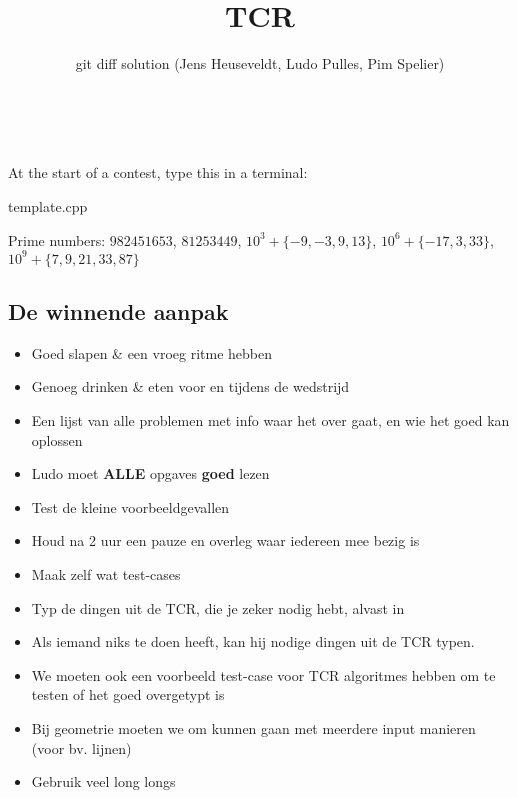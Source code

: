 \documentclass[8pt,a4paper,landscape,oneside]{amsart}
\title{TCR}
\author{git diff solution (Jens Heuseveldt, Ludo Pulles, Pim Spelier)}
\begin{document}
\begin{multicols*}{3}
\maketitle
\begin{center}
	\makeatletter
	\textbf{\@title} \\
	\emph{\@author}
	\makeatother
\end{center}

\tableofcontents

\begin{center}
At the start of a contest, type this in a terminal:
\end{center}



\begin{center}
template.cpp
\end{center}



Prime numbers: $\mathit{982451653}$, $\mathit{81253449}$, $10^3 + \{-9,-3,9,13\}$, $10^6 + \{-17, 3, 33\}$, $10^9 + \{7,9,21,33,87\}$

\subsection{De winnende aanpak}

\begin{itemize}
	\setlength\itemsep{-.25em}
	\item Goed slapen \& een vroeg ritme hebben
	\item Genoeg drinken \& eten voor en tijdens de wedstrijd
	\item Een lijst van alle problemen met info waar het over gaat, en wie het goed kan oplossen
	\item Ludo moet {\huge\textbf{ALLE}} opgaves \textbf{goed} lezen
	\item Test de kleine voorbeeldgevallen
	\item Houd na 2 uur een pauze en overleg waar iedereen mee bezig is
	\item Maak zelf wat test-cases
	\item Typ de dingen uit de TCR, die je zeker nodig hebt, alvast in
	\item Als iemand niks te doen heeft, kan hij nodige dingen uit de TCR typen.
	\item We moeten ook een voorbeeld test-case voor TCR algoritmes hebben om te testen of het goed overgetypt is
	\item Bij geometrie moeten we om kunnen gaan met meerdere input manieren (voor bv. lijnen)
	\item Gebruik veel long long\textquotesingle s
\end{itemize}


\end{multicols*}
\end{document}

